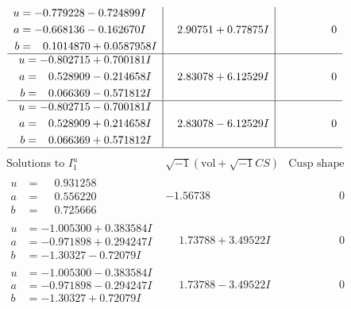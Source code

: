 \documentclass[1p]{elsarticle_modified}
\theoremstyle{definition}
\newcommand{\I}{\sqrt{-1}}
\begin{document}
$$\begin{array}{c|c|c}
\begin{aligned}
u &= -0.779228 - 0.724899 I \\
a &= -0.668136 - 0.162670 I \\
b &= \phantom{-}0.1014870 + 0.0587958 I\end{aligned}
 & \phantom{-}2.90751 + 0.77875 I & \phantom{-0.000000 } 0 \\ \hline\begin{aligned}
u &= -0.802715 + 0.700181 I \\
a &= \phantom{-}0.528909 - 0.214658 I \\
b &= \phantom{-}0.066369 - 0.571812 I\end{aligned}
 & \phantom{-}2.83078 + 6.12529 I & \phantom{-0.000000 } 0 \\ \hline\begin{aligned}
u &= -0.802715 - 0.700181 I \\
a &= \phantom{-}0.528909 + 0.214658 I \\
b &= \phantom{-}0.066369 + 0.571812 I\end{aligned}
 & \phantom{-}2.83078 - 6.12529 I & \phantom{-0.000000 } 0\\
 \hline 
 \end{array}$$\newpage$$\begin{array}{c|c|c}  
\text{Solutions to }I^u_{1}& \I (\text{vol} + \sqrt{-1}CS) & \text{Cusp shape}\\
 \hline 
\begin{aligned}
u &= \phantom{-}0.931258\phantom{ +0.000000I} \\
a &= \phantom{-}0.556220\phantom{ +0.000000I} \\
b &= \phantom{-}0.725666\phantom{ +0.000000I}\end{aligned}
 & -1.56738\phantom{ +0.000000I} & \phantom{-0.000000 } 0 \\ \hline\begin{aligned}
u &= -1.005300 + 0.383584 I \\
a &= -0.971898 + 0.294247 I \\
b &= -1.30327 - 0.72079 I\end{aligned}
 & \phantom{-}1.73788 + 3.49522 I & \phantom{-0.000000 } 0 \\ \hline\begin{aligned}
u &= -1.005300 - 0.383584 I \\
a &= -0.971898 - 0.294247 I \\
b &= -1.30327 + 0.72079 I\end{aligned}
 & \phantom{-}1.73788 - 3.49522 I & \phantom{-0.000000 } 0 \\ \hline\begin{aligned}

\end{aligned}
\end{array}$$
\end{document}
